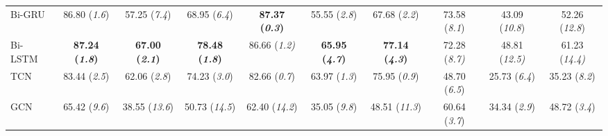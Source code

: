 \documentclass[letterpaper, 10 pt, conference]{ieeeconf}
\begin{document}
\begin{table*}[t]
{\begin{tabular}{|l|ccc|ccc|ccc|}
Bi-GRU   
& 86.80 (\textit{\scriptsize\scriptsize1.6}) 
& 57.25 (\textit{\scriptsize\scriptsize 7.4}) 
& 68.95 (\textit{\scriptsize\scriptsize 6.4})
& \textbf{87.37 (\textit{\scriptsize\scriptsize 0.3})} 
& 55.55 (\textit{\scriptsize\scriptsize 2.8}) 
& 67.68 (\textit{\scriptsize\scriptsize 2.2})
& 73.58 (\textit{\scriptsize\scriptsize 8.1}) 
& 43.09 (\textit{\scriptsize\scriptsize 10.8}) 
& 52.26 (\textit{\scriptsize\scriptsize 12.8}) \\

Bi-LSTM \cite{Zou2019DeepBiLSTMRecognition}     
& \textbf{87.24 (\textit{\scriptsize\scriptsize1.8})} 
& \textbf{67.00 (\textit{\scriptsize\scriptsize 2.1})} 
& \textbf{78.48 (\textit{\scriptsize\scriptsize 1.8})}
& 86.66 (\textit{\scriptsize\scriptsize 1.2)}
& \textbf{65.95 (\textit{\scriptsize\scriptsize 4.7})} 
& \textbf{77.14 (\textit{\scriptsize\scriptsize 4.3})}
& 72.28 (\textit{\scriptsize\scriptsize 8.7)}
& 48.81 (\textit{\scriptsize\scriptsize 12.5)}
& 61.23 (\textit{\scriptsize\scriptsize 14.4)} \\

TCN \cite {Lea2017TemporalDetection}
& 83.44 (\textit{\scriptsize\scriptsize2.5}) 
& 62.06 (\textit{\scriptsize\scriptsize 2.8})
& 74.23 (\textit{\scriptsize\scriptsize 3.0})
& 82.66 (\textit{\scriptsize\scriptsize 0.7})
& 63.97 (\textit{\scriptsize\scriptsize 1.3}) 
&  75.95 (\textit{\scriptsize\scriptsize 0.9})
& 48.70 (\textit{\scriptsize\scriptsize 6.5}) 
& 25.73 (\textit{\scriptsize\scriptsize 6.4}) 
& 35.23 (\textit{\scriptsize\scriptsize 8.2}) \\

GCN \cite{Li2019SpatialRecognition}
& 65.42 (\textit{\scriptsize\scriptsize9.6}) 
& 38.55 (\textit{\scriptsize\scriptsize 13.6}) 
& 50.73 (\textit{\scriptsize\scriptsize 14.5})
& 62.40 (\textit{\scriptsize\scriptsize 14.2}) 
& 35.05 (\textit{\scriptsize\scriptsize 9.8})  
& 48.51 (\textit{\scriptsize\scriptsize 11.3})
& 60.64 (\textit{\scriptsize\scriptsize 3.7})
& 34.34 (\textit{\scriptsize\scriptsize 2.9})
& 48.72 (\textit{\scriptsize\scriptsize 3.4})
\end{tabular}}
\label{EvalDataset4Class}
\end{table*}
\end{document}
